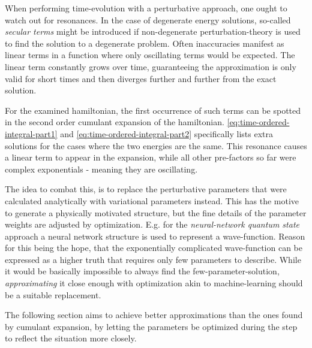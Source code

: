 When performing time-evolution with a perturbative approach, one ought to watch out for resonances.
In the case of degenerate energy solutions, so-called \emph{secular terms} \cite{secularTermsPerturbation} might be introduced if non-degenerate perturbation-theory is used to find the solution to a degenerate problem. 
Often inaccuracies manifest as linear terms in a function where only oscillating terms would be expected.
The linear term constantly grows over time, guaranteeing the approximation is only valid for short times and then diverges further and further from the exact solution.

For the examined hamiltonian, the first occurrence of such terms can be spotted in the second order cumulant expansion of the hamiltonian.
\autoref{eq:time-ordered-integral-part1} and \autoref{eq:time-ordered-integral-part2} specifically lists extra solutions for the cases where the two energies are the same.
This resonance causes a linear term to appear in the expansion, while all other pre-factors so far were complex exponentials - meaning they are oscillating.

The idea to combat this, is to replace the perturbative parameters that were calculated analytically with variational parameters instead.
This has the motive to generate a physically motivated structure, but the fine details of the parameter weights are adjusted by optimization.
E.g. for the \emph{neural-network quantum state} \cite{neuralNetworkQuantumStates} approach a neural network structure is used to represent a wave-function.
Reason for this being the hope, that the exponentially complicated wave-function can be expressed as a \glqq higher truth\grqq{} that requires only few parameters to describe.
While it would be basically impossible to always find the few-parameter-solution, \emph{approximating} it close enough with optimization akin to machine-learning should be a suitable replacement.

The following section aims to achieve better approximations than the ones found by cumulant expansion, by letting the parameters be optimized during the step to reflect the situation more closely.
